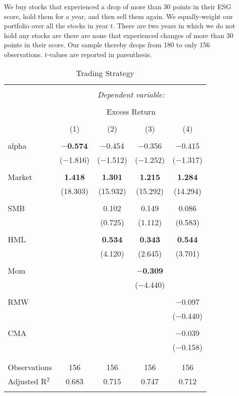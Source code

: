 \documentclass[11pt]{article}
\newcommand\fnote[1]{\captionsetup{font=small}\caption*{#1}}
\begin{document}
\begin{table}[!htbp] \centering 
	\caption{Trading Strategy} 
	\fnote{We buy stocks that experienced a drop of more than 30 points in their ESG score, hold them for a year, and then sell them again. We equally-weight our portfolio over all the stocks in year $t$. There are two years in which we do not hold any stocks are there are none that experienced changes of more than 30 points in their score. Our sample thereby drops from 180 to only 156 observations. $t$-values are reported in parenthesis. }
	\label{tab:tradingstrategy} 
	\begin{tabular}{@{\extracolsep{5pt}}lcccc} 
		\\[-1.8ex]\hline 
		\hline \\[-1.8ex] 
		& \multicolumn{4}{c}{\textit{Dependent variable:}} \\ 
		\cline{2-5} 
		\\[-1.8ex] & \multicolumn{4}{c}{Excess Return} \\ 
		\\[-1.8ex] & (1) & (2) & (3) & (4)\\ 
		\hline \\[-1.8ex] 
		alpha & \textbf{$-$0.574} & $-$0.454 & $-$0.356 & $-$0.415 \\ 
		& ($-$1.816) & ($-$1.512) & ($-$1.252) & ($-$1.317) \\ 
		& & & & \\ 
		Market & \textbf{1.418} & \textbf{1.301} & \textbf{1.215} & \textbf{1.284} \\ 
		& (18.303) & (15.932) & (15.292) & (14.294) \\ 
		& & & & \\ 
		SMB &  & 0.102 & 0.149 & 0.086 \\ 
		&  & (0.725) & (1.112) & (0.583) \\ 
		& & & & \\ 
		HML &  & \textbf{0.534} & \textbf{0.343} & \textbf{0.544} \\ 
		&  & (4.120) & (2.645) & (3.701) \\ 
		& & & & \\ 
		Mom &  &  & \textbf{$-$0.309} &  \\ 
		&  &  & ($-$4.440) &  \\ 
		& & & & \\ 
		RMW &  &  &  & $-$0.097 \\ 
		&  &  &  & ($-$0.440) \\ 
		& & & & \\ 
		CMA &  &  &  & $-$0.039 \\ 
		&  &  &  & ($-$0.158) \\ 
		& & & & \\ 
		\hline \\[-1.8ex] 
		Observations & 156 & 156 & 156 & 156 \\ 
		Adjusted R$^{2}$ & 0.683 & 0.715 & 0.747 & 0.712 \\ 
		\hline 
		\hline \\[-1.8ex] 
	\end{tabular} 
\end{table} 
\end{document}
